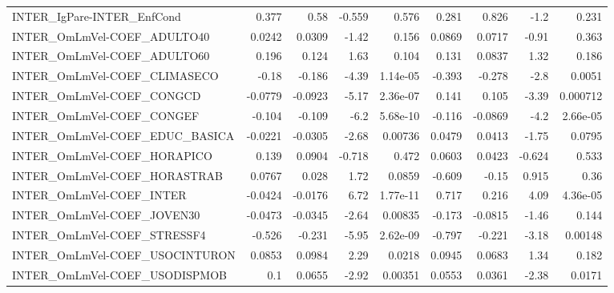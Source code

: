 \begin{tabular}{lrrrrrrrr}
INTER\_IgPare-INTER\_EnfCond            &       0.377 &         0.58 &   -0.559 &    0.576 &      0.281 &       0.826 &         -1.2 &         0.231 \\
INTER\_OmLmVel-COEF\_ADULTO40           &      0.0242 &       0.0309 &    -1.42 &    0.156 &     0.0869 &      0.0717 &        -0.91 &         0.363 \\
INTER\_OmLmVel-COEF\_ADULTO60           &       0.196 &        0.124 &     1.63 &    0.104 &      0.131 &      0.0837 &         1.32 &         0.186 \\
INTER\_OmLmVel-COEF\_CLIMASECO          &       -0.18 &       -0.186 &    -4.39 & 1.14e-05 &     -0.393 &      -0.278 &         -2.8 &        0.0051 \\
INTER\_OmLmVel-COEF\_CONGCD             &     -0.0779 &      -0.0923 &    -5.17 & 2.36e-07 &      0.141 &       0.105 &        -3.39 &      0.000712 \\
INTER\_OmLmVel-COEF\_CONGEF             &      -0.104 &       -0.109 &     -6.2 & 5.68e-10 &     -0.116 &     -0.0869 &         -4.2 &      2.66e-05 \\
INTER\_OmLmVel-COEF\_EDUC\_BASICA        &     -0.0221 &      -0.0305 &    -2.68 &  0.00736 &     0.0479 &      0.0413 &        -1.75 &        0.0795 \\
INTER\_OmLmVel-COEF\_HORAPICO           &       0.139 &       0.0904 &   -0.718 &    0.472 &     0.0603 &      0.0423 &       -0.624 &         0.533 \\
INTER\_OmLmVel-COEF\_HORASTRAB          &      0.0767 &        0.028 &     1.72 &   0.0859 &     -0.609 &       -0.15 &        0.915 &          0.36 \\
INTER\_OmLmVel-COEF\_INTER              &     -0.0424 &      -0.0176 &     6.72 & 1.77e-11 &      0.717 &       0.216 &         4.09 &      4.36e-05 \\
INTER\_OmLmVel-COEF\_JOVEN30            &     -0.0473 &      -0.0345 &    -2.64 &  0.00835 &     -0.173 &     -0.0815 &        -1.46 &         0.144 \\
INTER\_OmLmVel-COEF\_STRESSF4           &      -0.526 &       -0.231 &    -5.95 & 2.62e-09 &     -0.797 &      -0.221 &        -3.18 &       0.00148 \\
INTER\_OmLmVel-COEF\_USOCINTURON        &      0.0853 &       0.0984 &     2.29 &   0.0218 &     0.0945 &      0.0683 &         1.34 &         0.182 \\
INTER\_OmLmVel-COEF\_USODISPMOB         &         0.1 &       0.0655 &    -2.92 &  0.00351 &     0.0553 &      0.0361 &        -2.38 &        0.0171 \\

\end{tabular}
